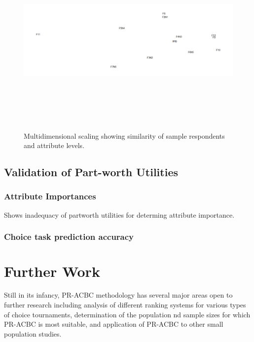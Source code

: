 \documentclass[a4paper, 12pt]{article}
\begin{document}
\begin{figure}[!htpb]
	\centering
	\includegraphics[width=4.5in, height=3.75in]{FNMDS.png}
	\caption{Multidimensional scaling showing similarity of sample respondents and attribute levels.}
	\label{MDSout1}
\end{figure}





\newpage
\subsection{Validation of Part-worth Utilities}

\subsubsection{Attribute Importances}
Shows inadequacy of partworth utilities for determing attribute importance.



\subsubsection{Choice task prediction accuracy}



\section{Further Work}
Still in its infancy, PR-ACBC methodology has several major areas open to further research including analysis of  different ranking systems for various types of choice tournaments, determination of the population nd sample sizes for which PR-ACBC is most suitable, and application of PR-ACBC to other small population studies.
\end{document}
